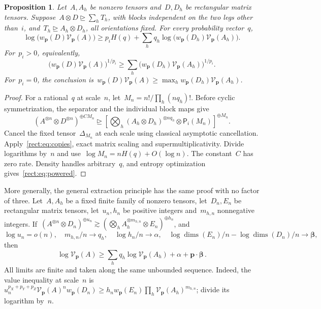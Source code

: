 \documentclass[11pt,letterpaper]{article}
\newtheorem{proposition}[theorem]{Proposition}
\theoremstyle{definition}
\numberwithin{equation}{section}
\newcommand{\degen}{\unrhd}
\begin{document}
\begin{proposition}\label{rect:prop:shared}
Let~$A,A_h$ be nonzero tensors and~$D,D_h$ be rectangular matrix tensors. Suppose~$A\otimes D\degen\sum_hT_h$, with blocks independent on the two legs other than~$i$, and~$T_h\degen A_h\otimes D_h$, all orientations fixed. For every probability vector~$q$,
\begin{equation}\label{rect:eq:entropy}
 \log\bigl(w_{\mathbf p}(D)\mathcal V_{\mathbf p}(A)\bigr)
 \geq p_iH(q)+
 \sum_hq_h\log\bigl(w_{\mathbf p}(D_h)\mathcal V_{\mathbf p}(A_h)\bigr).
\end{equation}
For~$p_i>0$, equivalently,
\begin{equation}\label{rect:eq:powered}
 \bigl(w_{\mathbf p}(D)\mathcal V_{\mathbf p}(A)\bigr)^{1/p_i}
 \geq\sum_h
 \bigl(w_{\mathbf p}(D_h)\mathcal V_{\mathbf p}(A_h)\bigr)^{1/p_i}.
\end{equation}
For~$p_i=0$, the conclusion is~$w_{\mathbf p}(D)\mathcal V_{\mathbf p}(A)\geq\max_h w_{\mathbf p}(D_h)\mathcal V_{\mathbf p}(A_h)$.
\end{proposition}
\begin{proof}
For a rational~$q$ at scale~$n$, let~$M_n=n!/\prod_h(nq_h)!$. Before cyclic symmetrization, the separator and the individual block maps give
\begin{equation*}
 (A^{\otimes n}\otimes D^{\otimes n})^{\oplus CM_n}
 \degen
 \left[
 \bigotimes_h(A_h\otimes D_h)^{\otimes nq_h}\otimes \mathsf P_i(M_n)
 \right]^{\oplus M_n}.
\end{equation*}
Cancel the fixed tensor~$\Delta_{M_n}$ at each scale using classical asymptotic cancellation. Apply~\eqref{rect:eq:copies}, exact matrix scaling and supermultiplicativity. Divide logarithms by~$n$ and use~$\log M_n=nH(q)+O(\log n)$. The constant~$C$ has zero rate. Density handles arbitrary~$q$, and entropy optimization gives~\eqref{rect:eq:powered}.
\end{proof}

More generally, the general extraction principle has the same proof with no factor of three. Let~$A,A_h$ be a fixed finite family of nonzero tensors, let~$D_n,E_n$ be rectangular matrix tensors, let~$u_n,h_n$ be positive integers and~$m_{h,n}$ nonnegative integers. If~$(A^{\otimes n}\otimes D_n)^{\oplus u_n}\gtrsim
(\bigotimes_h A_h^{\otimes m_{h,n}}\otimes E_n)^{\oplus h_n}$, and
\begin{equation*}
 \log u_n=o(n),\quad m_{h,n}/n\to q_h,\quad
 \log h_n/n\to\alpha,\quad
 \log\operatorname{dims}(E_n)/n-\log\operatorname{dims}(D_n)/n\to\boldsymbol\beta,
\end{equation*}
then
\begin{equation*}
 \log\mathcal V_{\mathbf p}(A)\geq
 \sum_hq_h\log\mathcal V_{\mathbf p}(A_h)+\alpha+
 \mathbf p\cdot\boldsymbol\beta\,.
\end{equation*}
All limits are finite and taken along the same unbounded sequence. Indeed, the value inequality at scale~$n$ is~$u_n^{p_X+p_Y+p_Z}\mathcal V_{\mathbf p}(A)^n w_{\mathbf p}(D_n)\geq h_n w_{\mathbf p}(E_n)\prod_h\mathcal V_{\mathbf p}(A_h)^{m_{h,n}}$; divide its logarithm by~$n$.
\end{document}
